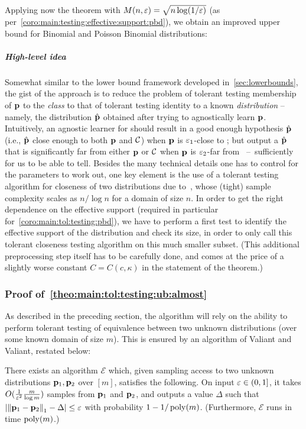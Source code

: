 \coromaintoltestingmlogm*

Applying now the theorem with $M(n,\varepsilon)=\sqrt{n\log(1/\varepsilon)}$ (as per~\cref{coro:main:testing:effective:support:pbd}), we obtain an improved upper bound for Binomial and Poisson Binomial distributions: 
\coromaintoltestingpbd*

\subparagraph{High-level idea} Somewhat similar to the lower bound framework developed in~\cref{sec:lowerbounds}, the gist of the approach is to reduce the problem of tolerant testing membership of $\mathbf{p}$ to the \emph{class} \class to that of tolerant testing identity to a known \emph{distribution} -- namely, the distribution $\hat{\mathbf{p}}$ obtained after trying to agnostically learn $\mathbf{p}$. Intuitively, an agnostic learner for \class should result in a good enough hypothesis $\hat{\mathbf{p}}$ (i.e., $\hat{\mathbf{p}}$ close enough to both $\mathbf{p}$ and $\mathcal{C}$) when $\mathbf{p}$ is $\varepsilon_1$-close to \class; but output a $\hat{\mathbf{p}}$ that is significantly far from either $\mathbf{p}$ or $\mathcal{C}$ when $\mathbf{p}$ is $\varepsilon_2$-far from \class~--~sufficiently for us to be able to tell.
Besides the many technical details one has to control for the parameters to work out, one key element is the use of a tolerant testing algorithm for closeness of two distributions due to~\cite{ValiantValiant:11}, whose (tight) sample complexity scales as $n/\log n$ for a domain of size $n$. In order to get the right dependence on the effective support (required in particular for~\cref{coro:main:tol:testing:pbd}), we have to perform a first test to identify the effective support of the distribution and check its size, in order to only call this tolerant closeness testing algorithm on this much smaller subset. (This additional preprocessing step itself has to be carefully done, and comes at the price of a slightly worse constant $C=C(c,\kappa)$ in the statement of the theorem.)

\subsubsection{Proof of~\cref{theo:main:tol:testing:ub:almost}}

As described in the preceding section, the algorithm will rely on the ability to perform tolerant testing of equivalence between two unknown distributions (over some known domain of size $m$). This is ensured by an algorithm of Valiant and Valiant, restated below:
\begin{theorem}\label{theo:samp:closeness:tolerant}
    There exists an algorithm $\mathcal{E}$ which, given sampling access to two unknown distributions $\mathbf{p}_1,\mathbf{p}_2$ over $[m]$, satisfies the following. On input $\varepsilon\in(0,1]$, it takes $O( \frac{1}{\varepsilon^2}\frac{m}{\log m} )$ samples from $\mathbf{p}_1$ and $\mathbf{p}_2$, and outputs a value $\Delta$ such that $\lvert {\lVert\ensuremath{\mathbf{p}}_1-\ensuremath{\mathbf{p}}_2{\rVert}}_1-\Delta \rvert \leq \varepsilon$ with probability $1-1/\operatorname*{poly}(m)$. (Furthermore, $\mathcal{E}$ runs in time $\operatorname*{poly}(m)$.)
\end{theorem}

